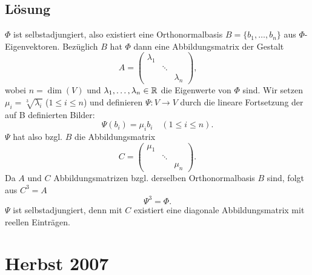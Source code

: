 \subsection{Lösung}
\( \Phi \) ist selbstadjungiert, also existiert eine Orthonormalbasis \( B = \{ b_1, \dots, b_n \} \) aus \( \Phi \)-Eigenvektoren. Bezüglich \( B \) hat \( \Phi \) dann eine Abbildungsmatrix der Gestalt
\begin{equation*}
	A = \left( \begin{smallmatrix}
		\lambda_1 & & \\
		 & \ddots & \\
		 & & \lambda_n
	\end{smallmatrix} \right)\text{,}
\end{equation*}
wobei \( n = \dim(V) \) und \( \lambda_1, \dots, \lambda_n \in \mathbb{R} \) die Eigenwerte von \( \Phi \) sind. Wir setzen \( \mu_i = \sqrt[3]{\lambda_i} \) (\( 1 \leq i \leq n \)) und definieren \( \Psi: V \to V \) durch die lineare Fortsetzung der auf B definierten Bilder:
\begin{equation*}
	\Psi(b_i) = \mu_ib_i \quad (1 \leq i \leq n)\text{.}
\end{equation*}
\( \Psi \) hat also bzgl. \( B \) die Abbildungsmatrix
\begin{equation*}
	C = \left( \begin{smallmatrix}
		\mu_1 & & \\
		 & \ddots &  \\
		 & & \mu_n
	\end{smallmatrix} \right)\text{.}
\end{equation*}
Da \( A \) und \( C \) Abbildungsmatrizen bzgl. derselben Orthonormalbasis \( B \) sind, folgt aus \( C^3=A \)
\begin{equation*}
	\Psi^3=\Phi\text{.}
\end{equation*}
\( \Psi \) ist selbstadjungiert, denn mit \( C \) existiert eine diagonale Abbildungsmatrix mit reellen Einträgen.

\newpage

\section{Herbst 2007}

